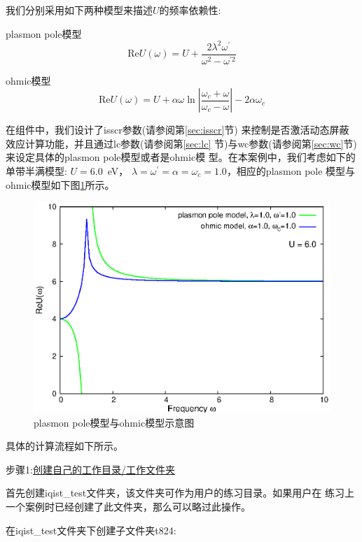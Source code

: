 我们分别采用如下两种模型来描述$U$的频率依赖性:

plasmon pole模型
\begin{equation}
\label{eq:ppm}
\text{Re} U(\omega) = U + \frac{2\lambda^{2}\omega^{\prime}}{\omega^{2} - \omega^{\prime 2}}
\end{equation}

ohmic模型
\begin{equation}
\label{eq:om}
\text{Re} U(\omega) = U + \alpha \omega \ln \left|\frac{\omega_{c} + \omega}{\omega_{c} - \omega}\right| - 2\alpha \omega_{c}
\end{equation}

在{\narcissus}组件中，我们设计了isscr参数(请参阅第\ref{sec:isscr}节)
来控制是否激活动态屏蔽效应计算功能，并且通过lc参数(请参阅第\ref{sec:lc}
节)与wc参数(请参阅第\ref{sec:wc}节)来设定具体的plasmon pole模型或者是ohmic模
型。在本案例中，我们考虑如下的单带半满模型: $U = 6.0$\ eV，
$\lambda = \omega^{\prime} = \alpha = \omega_{c} = 1.0$，相应的plasmon pole
模型与ohmic模型如下图\ref{fig:scr-model}所示。

\begin{figure}
\centering
\includegraphics{figure/model.eps}
\caption{plasmon pole模型与ohmic模型示意图} 
\label{fig:scr-model}
\end{figure}

具体的计算流程如下所示。

步骤1:\underline{创建自己的工作目录/工作文件夹}

首先创建iqist\_test文件夹，该文件夹可作为用户的练习目录。如果用户在
练习上一个案例时已经创建了此文件夹，那么可以略过此操作。

在iqist\_test文件夹下创建子文件夹t824:

